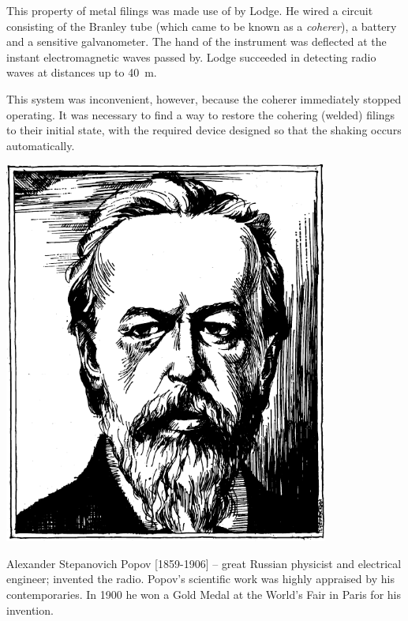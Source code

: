 This property of metal filings was made use of by Lodge. He wired a circuit consisting of the Branley tube (which came to be known as a \emph{coherer}), a battery and a sensitive galvanometer. The hand of the instrument was deflected at the instant electromagnetic waves passed by. Lodge succeeded in detecting radio waves at distances up to \SI{40}{\meter}.

This system was inconvenient, however, because the coherer immediately stopped operating. It was necessary to find a way to restore the cohering (welded) filings to their initial state, with the required device designed so that the shaking occurs automatically.


\begin{center}
\includegraphics[width=0.8\textwidth]{figures/popov.pdf}
\end{center}
{\small \textsf{{Alexander Stepanovich Popov [1859-1906]}} -- \textsf{\footnotesize great Russian physicist and electrical engineer; invented the radio. Popov's scientific work was highly appraised by his contemporaries. In 1900 he won a Gold Medal at the World's Fair in Paris for his invention.}}


